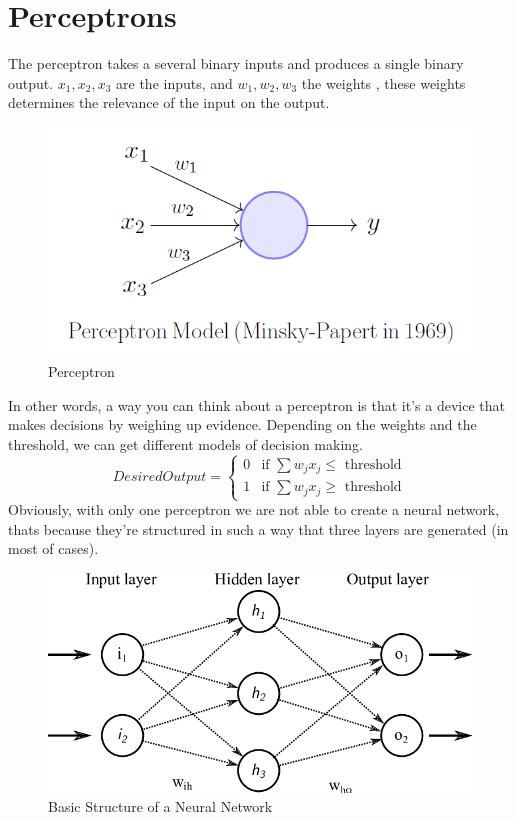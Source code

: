 \documentclass[12pt]{report}
\begin{document}
\section{Perceptrons}
The perceptron takes a several binary inputs and produces a single binary output. $x_1,x_2,x_3$ are the inputs, and $w_1,w_2,w_3$ the weights , these weights determines the relevance of the input on the output.
\begin{figure}[h]
  \caption{Perceptron}
  \centering
      \includegraphics[scale=0.25]{Resources/0_LJBO8UbtzK_SKMog.png}
\end{figure}
In other words, a way you can think about a perceptron is that it's a device that makes decisions by weighing up evidence. 
Depending on the weights and the threshold, we can get different models of decision making.
\begin{equation}
	Desired Output = \begin{cases} 0  & \mbox{if  } \sum{w_j x_j} \leq \mbox{ threshold} \\ 
		1  & \mbox{if  } \sum{w_j x_j} \geq \mbox{ threshold}  \end{cases}
		\end{equation}
Obviously, with only one perceptron we are not able to create a neural network, thats because they're structured in such a way that three layers are generated (in most of cases). 
\begin{figure}[h]
  \caption{Basic Structure of a Neural Network}
  \centering
      \includegraphics[scale=0.25]{Resources/Example-for-an-artificial-neural-network-with-two-input-neurons-two-hidden-neurons-and.png}
\end{figure}
\end{document}
